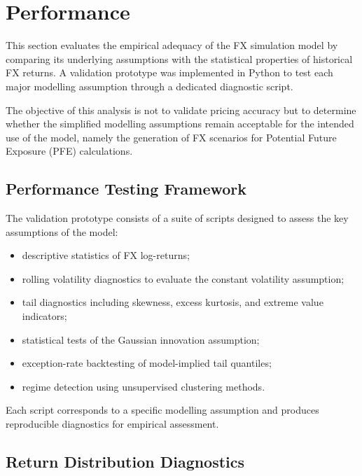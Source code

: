 \section{Performance}\label{Performance}
 
This section evaluates the empirical adequacy of the FX simulation model by comparing its underlying assumptions with the statistical properties of historical FX returns. A validation prototype was implemented in Python to test each major modelling assumption through a dedicated diagnostic script.

The objective of this analysis is not to validate pricing accuracy but to determine whether the simplified modelling assumptions remain acceptable for the intended use of the model, namely the generation of FX scenarios for Potential Future Exposure (PFE) calculations.

\subsection{Performance Testing Framework}

The validation prototype consists of a suite of scripts designed to assess the key assumptions of the model:

\begin{itemize}
	
	\item descriptive statistics of FX log-returns;
	
	\item rolling volatility diagnostics to evaluate the constant volatility assumption;
	
	\item tail diagnostics including skewness, excess kurtosis, and extreme value indicators;
	
	\item statistical tests of the Gaussian innovation assumption;
	
	\item exception-rate backtesting of model-implied tail quantiles;
	
	\item regime detection using unsupervised clustering methods.
	
\end{itemize}

Each script corresponds to a specific modelling assumption and produces reproducible diagnostics for empirical assessment.

\subsection{Return Distribution Diagnostics}

